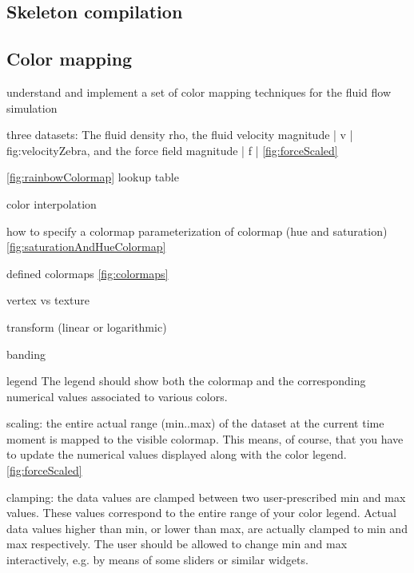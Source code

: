 \subsection{Skeleton compilation}
\subsection{Color mapping}


understand and implement a set of color mapping techniques for the fluid flow simulation

three datasets: The fluid density rho, the fluid velocity magnitude | v | fig:velocityZebra, and the force field magnitude | f | \ref{fig:forceScaled}

\ref{fig:rainbowColormap}
lookup table

color interpolation

how to specify a colormap
parameterization of colormap (hue and saturation) \ref{fig:saturationAndHueColormap}

defined colormaps \ref{fig:colormaps}
 
vertex vs texture

transform (linear or logarithmic)



banding 

legend  The legend should show both the colormap and the corresponding numerical values associated to various colors.


scaling: the entire actual range (min..max) of the dataset at the current time moment is mapped to the visible colormap. This means, of course, that you have to update the numerical values displayed along with the color legend.
\ref{fig:forceScaled}

clamping: the data values are clamped between two user-prescribed min and max values. These values correspond to the entire range of your color legend. Actual data values higher than min, or lower than max, are actually clamped to min and max respectively. The user should be allowed to change min and max interactively, e.g. by means of some sliders or similar widgets.
 
